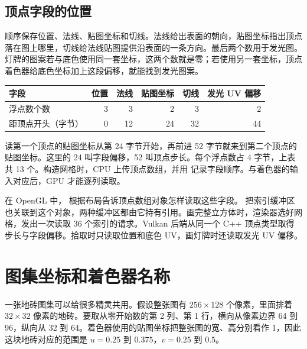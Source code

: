 \subsection{顶点字段的位置}
 顺序保存位置、法线、贴图坐标和切线。法线给出表面的朝向，贴图坐标指出顶点落在图上哪里，切线给法线贴图提供沿表面的一条方向。最后两个数用于发光图。灯牌的图案若与底色使用同一套坐标，这两个数就是零；若使用另一套坐标，顶点着色器给底色坐标加上这段偏移，就能找到发光图案。

\begin{center}
{\small\begin{tabularx}{.98\linewidth}{@{}Yrrrrr@{}}
\toprule
字段 & 位置 & 法线 & 贴图坐标 & 切线 & 发光 UV 偏移 \\
\midrule
浮点数个数 & 3 & 3 & 2 & 3 & 2 \\
距顶点开头（字节） & 0 & 12 & 24 & 32 & 44 \\
\bottomrule
\end{tabularx}}
\end{center}

读第一个顶点的贴图坐标从第 24 字节开始，再前进 52 字节就来到第二个顶点的贴图坐标。这里的 24 叫字段偏移，52 叫顶点步长。每个浮点数占 4 字节，上表共 13 个。构造网格时，CPU 上传顶点数组，并用  记录字段顺序。与着色器的输入对应后，GPU 才能逐列读取。

在 OpenGL 中， 根据布局告诉顶点数组对象怎样读取这些字段。 把索引缓冲区也关联到这个对象，两种缓冲区都由它持有引用。画完整立方体时，渲染器选好网格，发出一次读取 36 个索引的请求。Vulkan 后端从同一个 C++ 顶点类型取得步长与字段偏移。拾取时只读取位置和底色 UV，画灯牌时还读取发光 UV 偏移。


\clearpage
\section{图集坐标和着色器名称}\label{sec:data-atlas}
一张地砖图集可以给很多精灵共用。假设整张图有 \(256\times128\) 个像素，里面排着 \(32\times32\) 像素的地砖。要取从零开始数的第 2 列、第 1 行，横向从像素边界 64 到 96，纵向从 32 到 64。着色器使用的贴图坐标把整张图的宽、高分别看作 1，因此这块地砖对应的范围是 \(u=0.25\) 到 \(0.375\)，\(v=0.25\) 到 \(0.5\)。

